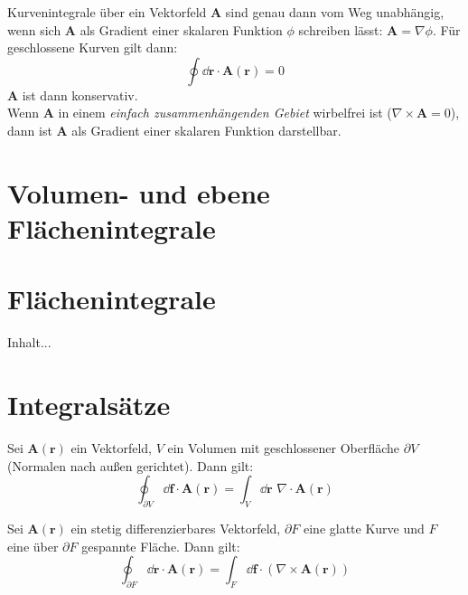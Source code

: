 \begin{framedthm}
Kurvenintegrale über ein Vektorfeld $\mathbf{A}$ sind genau dann vom Weg unabhängig, wenn sich $\mathbf{A}$ als Gradient einer skalaren Funktion $\phi$ schreiben lässt: $\mathbf{A} = \nabla \phi$. Für geschlossene Kurven gilt dann: 
\[
\oint \dd \mathbf{r} \cdot \mathbf{A}(\mathbf{r}) = 0
\]
$\mathbf{A}$ ist dann konservativ.\\
Wenn $\mathbf{A}$ in einem \textit{einfach zusammenhängenden Gebiet} wirbelfrei ist ($\nabla \times \mathbf{A} = 0$), dann ist $\mathbf{A}$ als Gradient einer skalaren Funktion darstellbar.
\end{framedthm}

\section{Volumen- und ebene Flächenintegrale}

\section{Flächenintegrale}

\begin{framedprop}[Parametrisierung]
	Inhalt...
\end{framedprop}

\section{Integralsätze}

\begin{framedthm}
	Sei $\mathbf{A}(\mathbf{r})$ ein Vektorfeld, $V$ ein Volumen mit geschlossener Oberfläche $\partial V$ (Normalen nach außen gerichtet). Dann gilt:
	\[
	\oint_{\partial V} \dd \mathbf{f} \cdot \mathbf{A}(\mathbf{r}) = \int_{V} \dd \mathbf{r} \,\, \nabla \cdot \mathbf{A}(\mathbf{r}) 
	\] 
\end{framedthm}

\begin{framedthm}
	Sei $\mathbf{A}(\mathbf{r})$ ein stetig differenzierbares Vektorfeld, $\partial F$ eine glatte Kurve und $F$ eine über $\partial F$ gespannte Fläche. Dann gilt:
	\[
	\oint_{\partial F} \dd \mathbf{r} \cdot \mathbf{A}(\mathbf{r}) = \int_F \dd \mathbf{f} \cdot (\nabla \times \mathbf{A}(\mathbf{r}))
	\]
\end{framedthm}

